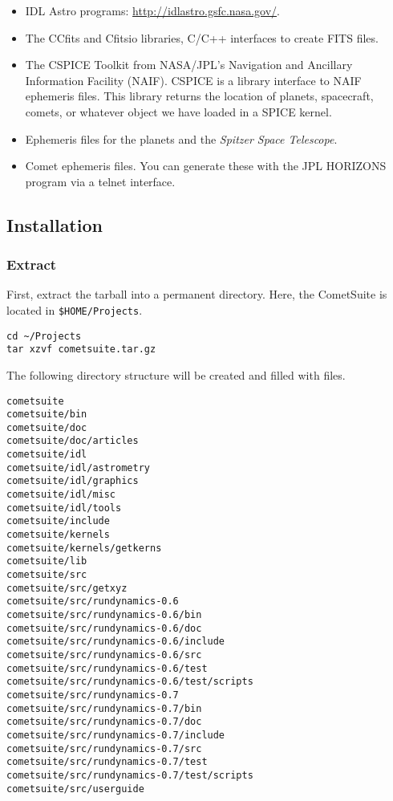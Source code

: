 \documentclass[12pt,letterpaper]{article}
\newcommand\cs{CometSuite}
\begin{document}
\begin{itemize}
\item IDL Astro programs: \url{http://idlastro.gsfc.nasa.gov/}.

\item The CCfits and Cfitsio libraries, C/C++ interfaces to create
FITS files.

\item The CSPICE Toolkit from NASA/JPL's Navigation and Ancillary
Information Facility (NAIF).  CSPICE is a library interface to NAIF
ephemeris files.  This library returns the location of planets,
spacecraft, comets, or whatever object we have loaded in a SPICE
kernel.

\item Ephemeris files for the planets and the \textit{Spitzer Space
Telescope}.

\item Comet ephemeris files.  You can generate these with the JPL
HORIZONS program via a telnet interface.

\end{itemize}

\subsection{Installation}\label{sec:install}
\subsubsection{Extract}
First, extract the tarball into a permanent directory.  Here, the
\cs{} is located in \texttt{\$HOME/Projects}.
\begin{lstlisting}
cd ~/Projects
tar xzvf cometsuite.tar.gz
\end{lstlisting}
The following directory structure will be created and filled with files.
\begin{lstlisting}
cometsuite
cometsuite/bin
cometsuite/doc
cometsuite/doc/articles
cometsuite/idl
cometsuite/idl/astrometry
cometsuite/idl/graphics
cometsuite/idl/misc
cometsuite/idl/tools
cometsuite/include
cometsuite/kernels
cometsuite/kernels/getkerns
cometsuite/lib
cometsuite/src
cometsuite/src/getxyz
cometsuite/src/rundynamics-0.6
cometsuite/src/rundynamics-0.6/bin
cometsuite/src/rundynamics-0.6/doc
cometsuite/src/rundynamics-0.6/include
cometsuite/src/rundynamics-0.6/src
cometsuite/src/rundynamics-0.6/test
cometsuite/src/rundynamics-0.6/test/scripts
cometsuite/src/rundynamics-0.7
cometsuite/src/rundynamics-0.7/bin
cometsuite/src/rundynamics-0.7/doc
cometsuite/src/rundynamics-0.7/include
cometsuite/src/rundynamics-0.7/src
cometsuite/src/rundynamics-0.7/test
cometsuite/src/rundynamics-0.7/test/scripts
cometsuite/src/userguide
\end{lstlisting}
\end{document}

